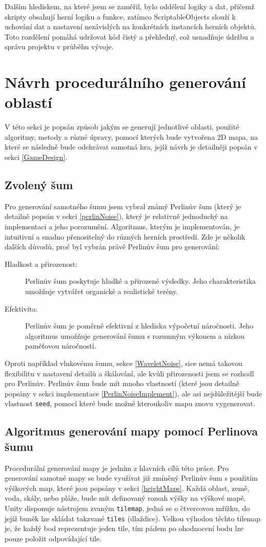 Dalším hlediskem, na které jsem se zaměřil, bylo oddělení logiky a dat, přičemž skripty obsahují herní logiku a funkce, zatímco ScriptableObjects slouží k uchování dat a nastavení nezávislých na konkrétních instancích herních objektů. Toto rozdělení pomáhá udržovat kód čistý a přehledný, což usnadňuje údržbu a správu projektu v průběhu vývoje.

\section{Návrh procedurálního generování oblastí}
V této sekci je popsán způsob jakým se generují jednotlivé oblasti, použité algoritmy, metody a různé úpravy, pomocí kterých bude vytvořena 2D mapa, na které se následně bude odehrávat samotná hra, jejíž návrh je detailněji popsán v sekci \ref{GameDesign}.

\subsection{Zvolený šum}
Pro generování samotného šumu jsem vybral známý Perlinův šum (který je detailně popsán v sekci \ref{perlinNoise}), který je relativně jednoduchý na implementaci a jeho porozumění. Algoritmus, kterým je implementován, je intuitivní a snadno přenositelný do různých herních prostředí. Zde je několik dalších důvodů, proč byl vybrán právě Perlinův šum pro generování:

\begin{description}
	\item[Hladkost a přirozenost:] Perlinův šum poskytuje hladké a přirozené výsledky. Jeho charakteristika umožňuje vytvářet organické a realistické terény.
	\item[Efektivita:] Perlinův šum je poměrně efektivní z hlediska výpočetní náročnosti. Jeho algoritmus umožňuje generování šumu s rozumným výkonem a nízkou paměťovou náročností.
\end{description}

Oproti například vlnkovému šumu, sekce \ref{WaveletNoise}, sice nemá takovou flexibilitu v nastavení detailů a škálování, ale kvůli přirozenosti jsem se rozhodl pro Perlinův. Perlinův šum bude mít mnoho vlastností (které jsou detailně popsány v sekci implementace \ref{PerlinNoiseImplement}), ale asi nejdůležitější bude vlastnost \texttt{seed}, pomocí které bude možné kteroukoliv mapu znovu vygenerovat.

\newpage
\subsection{Algoritmus generování mapy pomocí Perlinova šumu}
Procedurální generování mapy je jedním z hlavních cílů této práce. Pro generování samotné mapy se bude využívat již zmíněný Perlinův šum s použitím výškových map, které jsou popsány v sekci \ref{heightMaps}. Každá oblast, země, voda, skály, nebo pláže, bude mít definovaný rozsah výšky na výškové mapě. Unity disponuje nástrojem zvaným \texttt{tilemap}, jedná se o čtvercovou mřížku, do jejíž buněk lze skládat takzvané \texttt{tiles} (dlaždice). Velkou výhodou těchto tilemap je, že každý bod reprezentuje jeden tile, tím pádem po ohodnocení bodu lze pouze položit odpovídající tile.


